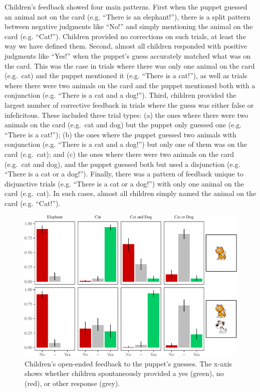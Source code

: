\documentclass[floatsintext,man]{apa6}
\theoremstyle{definition}
\theoremstyle{definition}
\theoremstyle{definition}
\theoremstyle{remark}
\begin{document}
Children's feedback showed four main patterns. First when the puppet
guessed an animal not on the card (e.g. \enquote{There is an
elephant!}), there is a split pattern between negative judgments like
\enquote{No!} and simply mentioning the animal on the card (e.g.
\enquote{Cat!}). Children provided no corrections on such trials, at
least the way we have defined them. Second, almost all children
responded with positive judgments like \enquote{Yes!} when the puppet's
guess accurately matched what was on the card. This was the case in
trials where there was only one animal on the card (e.g.~cat) and the
puppet mentioned it (e.g. \enquote{There is a cat!}), as well as trials
where there were two animals on the card and the puppet mentioned both
with a conjunction (e.g. \enquote{There is a cat and a dog!}). Third,
children provided the largest number of corrective feedback in trials
where the guess was either false or infelicitous. These included three
trial types: (a) the ones where there were two animals on the card
(e.g.~cat and dog) but the puppet only guessed one (e.g. \enquote{There
is a cat!}); (b) the ones where the puppet guessed two animals with
conjunction (e.g. \enquote{There is a cat and a dog!}) but only one of
them was on the card (e.g.~cat); and (c) the ones where there were two
animals on the card (e.g.~cat and dog), and the puppet guessed both but
used a disjunction (e.g. \enquote{There is a cat or a dog!}). Finally,
there was a pattern of feedback unique to disjunctive trials (e.g.
\enquote{There is a cat or a dog!}) with only one animal on the card
(e.g.~cat). In such cases, almost all children simply named the animal
on the card (e.g. \enquote{Cat!}).

\begin{figure}
\centering
\includegraphics{figs/study3JudgmentPlot-1.pdf}
\caption{\label{fig:study3JudgmentPlot}Children's open-ended feedback to the
puppet's guesses. The x-axis shows whether children spontaneously
provided a yes (green), no (red), or other response (grey).}
\end{figure}
\end{document}
